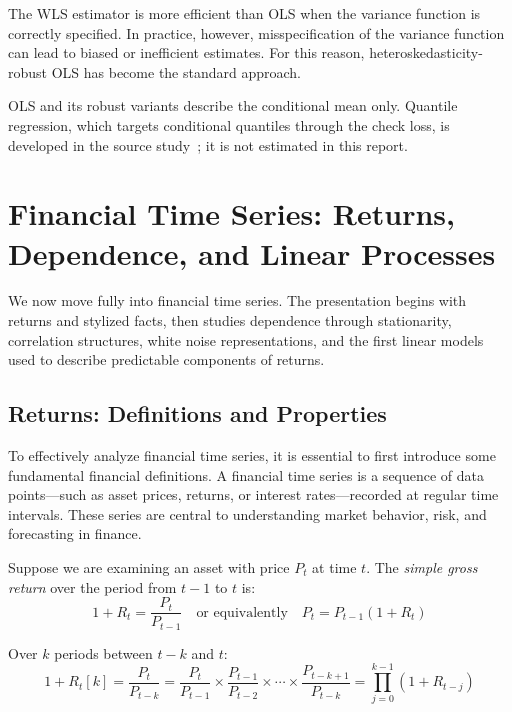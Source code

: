 The WLS estimator is more efficient than OLS when the variance function is correctly specified. In practice, however, misspecification of the variance function can lead to biased or inefficient estimates. For this reason, heteroskedasticity-robust OLS has become the standard approach.


OLS and its robust variants describe the conditional mean only. Quantile regression, which targets conditional quantiles through the check loss, is developed in the source study~\cite{team2}; it is not estimated in this report.

\section{Financial Time Series: Returns, Dependence, and Linear Processes}

We now move fully into financial time series. The presentation begins with returns and stylized facts, then studies dependence through stationarity, correlation structures, white noise representations, and the first linear models used to describe predictable components of returns.
\subsection{Returns: Definitions and Properties}\label{sec:returns-definitions}

To effectively analyze financial time series, it is essential to first introduce some fundamental financial definitions. A financial time series is a sequence of data points---such as asset prices, returns, or interest rates---recorded at regular time intervals. These series are central to understanding market behavior, risk, and forecasting in finance.

\begin{definition}
Suppose we are examining an asset with price $P_t$ at time $t$. The \emph{simple gross return} over the period from $t-1$ to $t$ is:
$$1 + R_t = \frac{P_t}{P_{t-1}} \quad \text{or equivalently} \quad P_t = P_{t-1}(1 + R_t)$$
\end{definition}

\begin{definition}
Over $k$ periods between $t-k$ and $t$:
$$1 + R_t[k] = \frac{P_t}{P_{t-k}} = \frac{P_t}{P_{t-1}} \times \frac{P_{t-1}}{P_{t-2}} \times \cdots \times \frac{P_{t-k+1}}{P_{t-k}} = \prod_{j=0}^{k-1}(1 + R_{t-j})$$
\end{definition}

